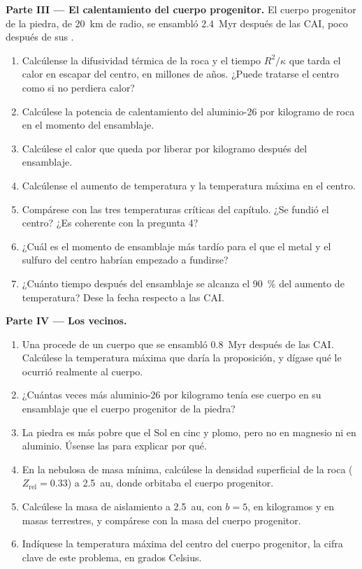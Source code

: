 \begin{problem}
\noindent\textbf{Parte III --- El calentamiento del cuerpo progenitor.}
El cuerpo progenitor de la piedra, de \qty{20}{km} de radio, se ensambló \qty{2.4}{Myr} después de
las CAI, poco después de sus .
\begin{enumerate}[resume]
  \item Calcúlense la difusividad térmica de la roca y el tiempo $R^2/\kappa$ que tarda
        el calor en escapar del centro, en millones de años. ¿Puede tratarse el centro
        como si no perdiera calor?
  \item Calcúlese la potencia de calentamiento del aluminio-26 por kilogramo de roca en el momento
        del ensamblaje.
  \item Calcúlese el calor que queda por liberar por kilogramo después del ensamblaje.
  \item Calcúlense el aumento de temperatura y la temperatura máxima en el centro.
  \item Compárese con las tres temperaturas críticas del capítulo. ¿Se fundió el
        centro? ¿Es coherente con la pregunta 4?
  \item ¿Cuál es el momento de ensamblaje más tardío para el que el metal y el sulfuro del
        centro habrían empezado a fundirse?
  \item ¿Cuánto tiempo después del ensamblaje se alcanza el \qty{90}{\percent} del aumento
        de temperatura? Dese la fecha respecto a las CAI.
\end{enumerate}

\noindent\textbf{Parte IV --- Los vecinos.}
\begin{enumerate}[resume]
  \item Una  procede de un cuerpo que se ensambló \qty{0.8}{Myr} después de las
        CAI. Calcúlese la temperatura máxima que daría la proposición, y dígase
        qué le ocurrió realmente al cuerpo.
  \item ¿Cuántas veces más aluminio-26 por kilogramo tenía ese cuerpo en su
        ensamblaje que el cuerpo progenitor de la piedra?
  \item La piedra es más pobre que el Sol en cinc y plomo, pero no en magnesio ni en
        aluminio. Úsense las  para explicar por qué.
  \item En la nebulosa de masa mínima, calcúlese la densidad superficial de la roca
        ($Z_{\mathrm{rel}} = 0.33$) a \qty{2.5}{au}, donde orbitaba el cuerpo
        progenitor.
  \item Calcúlese la masa de aislamiento a \qty{2.5}{au}, con $b = 5$, en kilogramos y
        en masas terrestres, y compárese con la masa del cuerpo progenitor.
  \item Indíquese la temperatura máxima del centro del cuerpo progenitor, la cifra
        clave de este problema, en grados Celsius.
\end{enumerate}
\end{problem}
